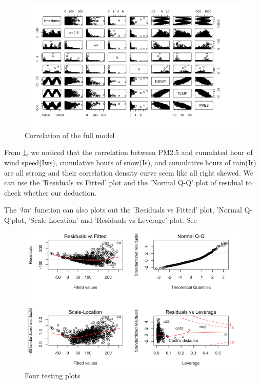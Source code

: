 \begin{figure}[H]
    \centering
  \includegraphics[width=1.0\textwidth]{Figures/correlationfull.png}
  \caption[Figures/correlation\_full.png]{Correlation of the full model}
  \label{fig:Correlation of the full model}
\end{figure}

From \ref{fig:Correlation of the full model}, we noticed that the correlation between PM2.5 and cumulated hour of wind speed(Iws), cumulative hours of snow(Is), and cumulative hours of rain(Ir) are all strong and their correlation density curve  seem like all right skewed. We can use the 'Residuals vs Fitted' plot and the 'Normal Q-Q' plot of residual to check whether our deduction.


The $`lm`$ function can also plots out the 'Residuals vs Fitted' plot, 'Normal Q-Q'plot, 'Scale-Location' and 'Residuals vs Leverage' plot: See 

\begin{figure}[H]
  \includegraphics[width=1.0\textwidth]{Figures/lm_full.png}
  \caption[Figures/lm\_full.png]{Four testing plots}
  \label{fig:Testing Plots of Full Model}
\end{figure}

